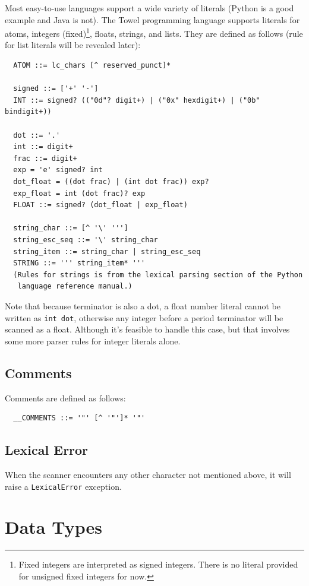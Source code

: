 \documentclass{book}
\begin{document}
Most easy-to-use languages support a wide variety of literals (Python is a good example and Java is not). The Towel programming language supports literals for atoms, integers (fixed)\footnote{Fixed integers are interpreted as signed integers. There is no literal provided for unsigned fixed integers for now.}, floats, strings, and lists. They are defined as follows (rule for list literals will be revealed later):
\begin{verbatim}
  ATOM ::= lc_chars [^ reserved_punct]*

  signed ::= ['+' '-']
  INT ::= signed? (("0d"? digit+) | ("0x" hexdigit+) | ("0b" bindigit+))

  dot ::= '.'
  int ::= digit+
  frac ::= digit+
  exp = 'e' signed? int
  dot_float = ((dot frac) | (int dot frac)) exp?
  exp_float = int (dot frac)? exp
  FLOAT ::= signed? (dot_float | exp_float)

  string_char ::= [^ '\' ''']
  string_esc_seq ::= '\' string_char
  string_item ::= string_char | string_esc_seq
  STRING ::= ''' string_item* '''
  (Rules for strings is from the lexical parsing section of the Python
   language reference manual.)
\end{verbatim}

Note that because terminator is also a dot, a float number literal cannot be written as \texttt{int dot}, otherwise any integer before a period terminator will be scanned as a float. Although it's feasible to handle this case, but that involves some more parser rules for integer literals alone.

\section{Comments}

Comments are defined as follows:
\begin{verbatim}
  __COMMENTS ::= '"' [^ '"']* '"'
\end{verbatim}

\section{Lexical Error}

When the scanner encounters any other character not mentioned above, it will raise a \texttt{LexicalError} exception.

\chapter{Data Types}
\label{chap:data-types}
\end{document}
